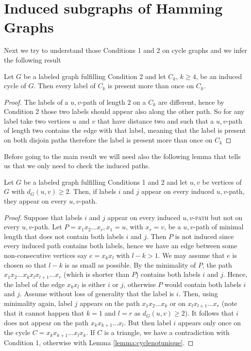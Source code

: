 \documentclass[12pt,a4paper,titlepage,openany]{report}
\begin{document}
\section{Induced subgraphs of Hamming Graphs}
Next we try to understand those Conditions 1 and 2 on cycle graphs and we infer the following result
\begin{lemma}\label{lemma:cyclenotunique}Let $G$ be a labeled graph fulfilling Condition 2 and let $C_k$, $k \geq 4$, be an induced cycle of $G$. Then every label of $C_k$ is present more than once on $C_k$.
\end{lemma}
\begin{proof}
The labels of a $u, v$-path of length $2$ on a $C_k$ are different, hence by Condition 2 those two labels should appear also along the other path. So for any label take two vertices $u$ and $v$ that have distance two and such that a $u,v$-path of length two contains the edge with that label, meaning that the label is present on both disjoin paths therefore the label is present more than once on $C_k$ 
\end{proof}
Before going to the main result we will need also the following lemma that tells us that we only need to check the induced paths.
\begin{lemma}\label{lemma:inducedpaths}Let $G$ be a labeled graph fulfilling Conditions 1 and 2 and let $u, v$ be vertices of $G$ with $d_G(u,v)\geq 2$. Then, if labels $i$ and $j$ appear on every induced $u, v$-path, they appear on every $u, v$-path.
\end{lemma}
\begin{proof}
Suppose that labels $i$ and $j$ appear on every induced \textsc{$u, v$-path} but not on every $u, v$-path. Let $P=x_1x_2...x_r, x_1=u$, with $x_r=v$, be a $u, v$-path of minimal length that does not contain both labels $i$ and $j$. Then $P$ is not induced since every induced path contains both labels, hence we have an edge between some non-consecutive vertices say $e=x_kx_l$ with $l-k>1$. We may assume that $e$ is chosen so that $l-k$ is as small as possible. By the minimality of $P$, the path $x_1x_2...x_kx_lx_{l+1}...x_r$ (which is shorter than $P$) contains both labels $i$ and $j$. Hence, the label of the edge $x_kx_l$ is either $i$ or $j$, otherwise $P$ would contain both labels $i$ and $j$. Assume without loss of generality that the label is $i$. Then, using minimality again, label $j$ appears on the path $x_1x_2...x_k$ or on $x_lx_{l+1}...x_r$ (note that it cannot happen that $k=1$ and $l=r$ as $d_G(u,v)\geq 2$). It follows that $i$ does not appear on the path $x_kx_{k+1}...x_l$. But then label $i$ appears only once on the cycle $C=x_kx_{k+1}...x_lx_k$. If $C$ is a triangle, we have a contradiction with Condition 1, otherwise with Lemma \ref{lemma:cyclenotunique}.
\end{proof}
\end{document}
